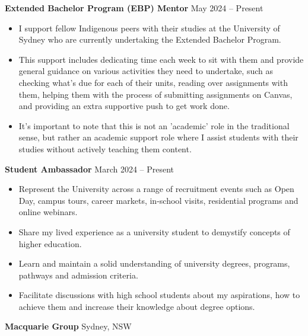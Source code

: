 \documentclass[11pt]{article}
\begin{document}
\textbf{Extended Bachelor Program (EBP) Mentor} \hfill May 2024 – Present
\begin{itemize}[noitemsep, topsep=0pt, partopsep=0pt, parsep=0pt]
    \item I support fellow Indigenous peers with their studies at the University of Sydney who are currently undertaking the Extended Bachelor Program.
    \item This support includes dedicating time each week to sit with them and provide general guidance on various activities they need to undertake, such as checking what's due for each of their units, reading over assignments with them, helping them with the process of submitting assignments on Canvas, and providing an extra supportive push to get work done. 
    \item It's important to note that this is not an 'academic' role in the traditional sense, but rather an academic support role where I assist students with their studies without actively teaching them content.
\end{itemize}

\textbf{Student Ambassador} \hfill March 2024 – Present
\begin{itemize}[noitemsep, topsep=0pt, partopsep=0pt, parsep=0pt]
    \item Represent the University across a range of recruitment events such as Open Day, campus tours, career markets, in-school visits, residential programs and online webinars.
    \item Share my lived experience as a university student to demystify concepts of higher education.
    \item Learn and maintain a solid understanding of university degrees, programs, pathways and admission criteria.
    \item Facilitate discussions with high school students about my aspirations, how to achieve them and increase their knowledge about degree options.
\end{itemize}

\vspace{12pt}

\textbf{Macquarie Group} \hfill Sydney, NSW
\end{document}
